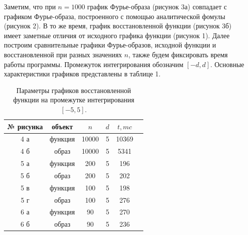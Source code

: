 \documentclass[a5paper, 10pt]{article}
\theoremstyle{definition}
\theoremstyle{plain}
\theoremstyle{remark}
\begin{document}
Заметим, что при $n=1000$ график Фурье-образа (рисунок 3а) совпадает с графиком Фурье-образа, построенного с помощью аналитической фомулы (рисунок 2). В то же время, график восстановленной функции (рисунок 3б) имеет заметные отличия от исходного графика функции (рисунок 1). Далее построим сравнительные графики Фурье-образов, исходной функции и восстановленной при разных значениях $n$, также будем фиксировать время работы программы. Промежуток интегрирования обозначим $[-d, d]$.
 Основные характеристики графиков представлены в таблице 1.



\begin{table}[h!]
\caption{Параметры графиков восстановленной функции на промежутке интегрирования $[-5, 5]$.}
\label{tabular:timesandtenses}
\begin{center}
\begin{tabular}{|c|c|c|c|c|c|}
\hline
№ рисунка & объект& $n$ & $d$ & $t, mc$  \\
\hline
 4 а& функция &10000 & 5 &10369  \\
\hline
4 б & образ & 10000 & 5 & 5341 \\
\hline
5 а &  функция &200  & 5 & 196 \\
\hline
5 б & образ & 200  & 5  & 202 \\
\hline
5 в &  функция & 100  & 5  & 198 \\
\hline
5 г & образ & 100  & 5  & 276 \\
\hline
6 а &  функция & 90  & 5  & 270 \\
\hline
6 б & образ & 90  & 5  & 236 \\
\hline
\end{tabular}
\end{center}
\end{table}
\end{document}

